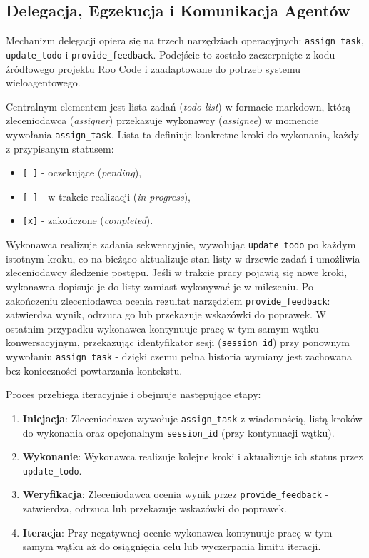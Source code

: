 \subsection{Delegacja, Egzekucja i Komunikacja Agentów}

Mechanizm delegacji opiera się na trzech narzędziach operacyjnych: \texttt{assign\_task}, \texttt{update\_todo} i \texttt{provide\_feedback}. Podejście to zostało zaczerpnięte z kodu źródłowego projektu Roo Code \cite{roocode_github} i zaadaptowane do potrzeb systemu wieloagentowego.

Centralnym elementem jest lista zadań (\textit{todo list}) w formacie markdown, którą zleceniodawca (\textit{assigner}) przekazuje wykonawcy (\textit{assignee}) w momencie wywołania \texttt{assign\_task}. Lista ta definiuje konkretne kroki do wykonania, każdy z przypisanym statusem:
\begin{itemize}
  \item \texttt{[ ]} - oczekujące (\textit{pending}),
  \item \texttt{[-]} - w trakcie realizacji (\textit{in progress}),
  \item \texttt{[x]} - zakończone (\textit{completed}).
\end{itemize}

Wykonawca realizuje zadania sekwencyjnie, wywołując \texttt{update\_todo} po każdym istotnym kroku, co na bieżąco aktualizuje stan listy w drzewie zadań i umożliwia zleceniodawcy śledzenie postępu. Jeśli w trakcie pracy pojawią się nowe kroki, wykonawca dopisuje je do listy zamiast wykonywać je w milczeniu. Po zakończeniu zleceniodawca ocenia rezultat narzędziem \texttt{provide\_feedback}: zatwierdza wynik, odrzuca go lub przekazuje wskazówki do poprawek. W ostatnim przypadku wykonawca kontynuuje pracę w tym samym wątku konwersacyjnym, przekazując identyfikator sesji (\texttt{session\_id}) przy ponownym wywołaniu \texttt{assign\_task} - dzięki czemu pełna historia wymiany jest zachowana bez konieczności powtarzania kontekstu.

Proces przebiega iteracyjnie i obejmuje następujące etapy:

\begin{enumerate}
  \item \textbf{Inicjacja}: Zleceniodawca wywołuje \texttt{assign\_task} z wiadomością, listą kroków do wykonania oraz opcjonalnym \texttt{session\_id} (przy kontynuacji wątku).
  \item \textbf{Wykonanie}: Wykonawca realizuje kolejne kroki i aktualizuje ich status przez \texttt{update\_todo}.
  \item \textbf{Weryfikacja}: Zleceniodawca ocenia wynik przez \texttt{provide\_feedback} - zatwierdza, odrzuca lub przekazuje wskazówki do poprawek.
  \item \textbf{Iteracja}: Przy negatywnej ocenie wykonawca kontynuuje pracę w tym samym wątku aż do osiągnięcia celu lub wyczerpania limitu iteracji.
\end{enumerate}

